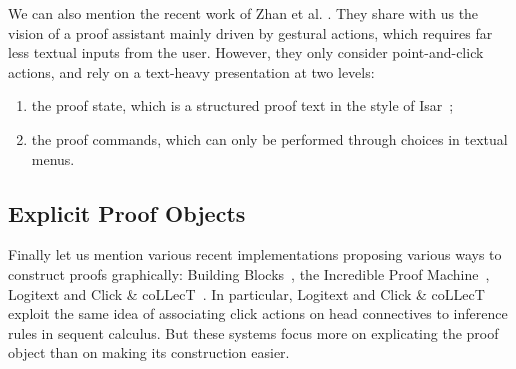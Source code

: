We can also mention the recent work of Zhan et al. .
They share with us the vision of a proof assistant mainly driven by gestural
actions, which requires far less textual inputs from the user. However, they
only consider point-and-click actions, and rely on a text-heavy presentation at
two levels:
\begin{enumerate}
  \item the proof state, which is a structured proof text in the style of
  Isar~;
  \item the proof commands, which can only be performed through choices in textual menus.
\end{enumerate}



\subsection*{Explicit Proof Objects}

Finally let us mention various recent implementations proposing various ways to
construct proofs graphically: Building Blocks~, the
Incredible Proof Machine~,
Logitext and Click \&
coLLecT~\cite{clickcollect}. In particular, Logitext and Click \& coLLecT
exploit the same idea of associating click actions on head connectives to
inference rules in sequent calculus. But these systems focus more on explicating
the proof object than on making its construction easier.


